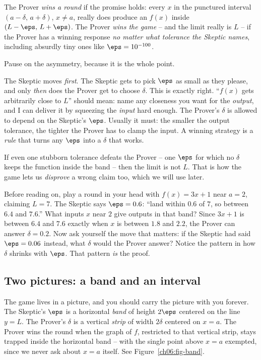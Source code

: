 The Prover \emph{wins a round} if the promise holds: every $x$ in the punctured
interval $(a-\delta,\,a+\delta)$, $x\ne a$, really does produce an $f(x)$ inside
$(L-\eps,\,L+\eps)$. The Prover \emph{wins the game} -- and the limit really is
$L$ -- if the Prover has a winning response \emph{no matter what tolerance the
Skeptic names}, including absurdly tiny ones like $\eps = 10^{-100}$.

Pause on the asymmetry, because it is the whole point.

\begin{intuitionbox}
The Skeptic moves \emph{first}. The Skeptic gets to pick $\eps$ as small as they
please, and only \emph{then} does the Prover get to choose $\delta$. This is
exactly right. ``$f(x)$ gets arbitrarily close to $L$'' should mean: name any
closeness you want for the \emph{output}, and I can deliver it by squeezing the
\emph{input} hard enough. The Prover's $\delta$ is allowed to depend on the
Skeptic's $\eps$. Usually it must: the smaller the output tolerance, the tighter
the Prover has to clamp the input. A winning strategy is a \emph{rule} that
turns any $\eps$ into a $\delta$ that works.
\end{intuitionbox}

If even one stubborn tolerance defeats the Prover -- one $\eps$ for which no
$\delta$ keeps the function inside the band -- then the limit is not $L$. That is
how the game lets us \emph{disprove} a wrong claim too, which we will use later.

\begin{walkbox}
Before reading on, play a round in your head with $f(x) = 3x + 1$ near $a = 2$,
claiming $L = 7$. The Skeptic says $\eps = 0.6$: ``land within $0.6$ of $7$, so
between $6.4$ and $7.6$.'' What inputs $x$ near $2$ give outputs in that band?
Since $3x+1$ is between $6.4$ and $7.6$ exactly when $x$ is between $1.8$ and
$2.2$, the Prover can answer $\delta = 0.2$. Now ask yourself the move that
matters: if the Skeptic had said $\eps = 0.06$ instead, what $\delta$ would the
Prover answer? Notice the pattern in how $\delta$ shrinks with $\eps$. That
pattern \emph{is} the proof.
\end{walkbox}

\subsection{Two pictures: a band and an interval}

The game lives in a picture, and you should carry the picture with you forever.
The Skeptic's $\eps$ is a horizontal \emph{band} of height $2\eps$ centered on
the line $y = L$. The Prover's $\delta$ is a vertical \emph{strip} of width
$2\delta$ centered on $x = a$. The Prover wins the round when the graph of $f$,
restricted to that vertical strip, stays trapped inside the horizontal band --
with the single point above $x=a$ exempted, since we never ask about $x=a$
itself. See Figure~\ref{ch06:fig-band}.

